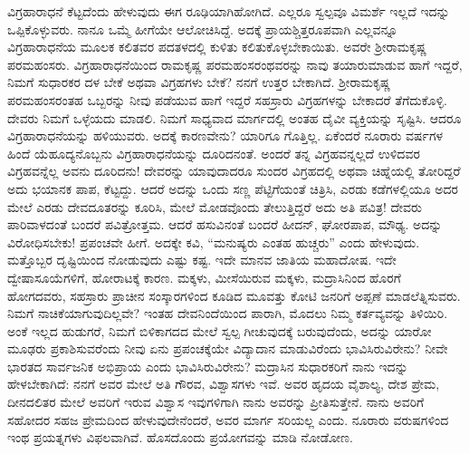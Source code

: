 ವಿಗ್ರಹಾರಾಧನೆ ಕೆಟ್ಟದೆಂದು ಹೇಳುವುದು ಈಗ ರೂಢಿಯಾಗಿಹೋಗಿದೆ. ಎಲ್ಲರೂ ಸ್ವಲ್ಪವೂ ವಿಮರ್ಶೆ ಇಲ್ಲದೆ ಇದನ್ನು ಒಪ್ಪಿಕೊಳ್ಳುವರು. ನಾನೂ ಒಮ್ಮೆ ಹೀಗೆಯೇ ಆಲೋಚಿ\-ಸಿದ್ದೆ. ಅದಕ್ಕೆ ಪ್ರಾಯಶ್ಚಿತ್ತರೂಪವಾಗಿ ಎಲ್ಲವನ್ನೂ ವಿಗ್ರಹಾರಾಧನೆಯ ಮೂಲಕ ಕಲಿತವರ ಪದತಳದಲ್ಲಿ ಕುಳಿತು ಕಲಿತುಕೊಳ್ಳಬೇಕಾಯಿತು. ಅವರೇ ಶ‍್ರೀರಾಮಕೃಷ್ಣ ಪರಮಹಂಸರು. ವಿಗ್ರಹಾರಾಧನೆಯಿಂದ ರಾಮಕೃಷ್ಣ ಪರಮಹಂಸರಂಥವರನ್ನು ನಾವು ತಯಾರು\-ಮಾಡುವ ಹಾಗೆ ಇದ್ದರೆ, ನಿಮಗೆ ಸುಧಾರಕರ ದಳ ಬೇಕೆ ಅಥವಾ ವಿಗ್ರಹಗಳು ಬೇಕೆ? ನನಗೆ ಉತ್ತರ ಬೇಕಾಗಿದೆ. ಶ‍್ರೀರಾಮಕೃಷ್ಣ ಪರಮಹಂಸರಂತಹ ಒಬ್ಬರನ್ನು ನೀವು ಪಡೆಯುವ ಹಾಗೆ ಇದ್ದರೆ ಸಹಸ್ರಾರು ವಿಗ್ರಹಗಳನ್ನು ಬೇಕಾದರೆ ತೆಗೆದುಕೊಳ್ಳಿ. ದೇವರು ನಿಮಗೆ ಒಳ್ಳೆಯದು ಮಾಡಲಿ. ನಿಮಗೆ ಸಾಧ್ಯವಾದ ಮಾರ್ಗದಲ್ಲಿ ಅಂತಹ ದೈವೀ ವ್ಯಕ್ತಿಯನ್ನು ಸೃಷ್ಟಿಸಿ. ಆದರೂ ವಿಗ್ರಹಾರಾಧನೆಯನ್ನು ಹಳಿಯುವರು. ಅದಕ್ಕೆ ಕಾರಣವೇನು? ಯಾರಿಗೂ ಗೊತ್ತಿಲ್ಲ. ಏಕೆಂದರೆ ನೂರಾರು ವರ್ಷಗಳ ಹಿಂದೆ ಯೆಹೂದ್ಯನೊಬ್ಬನು ವಿಗ್ರಹಾ\-ರಾಧನೆಯನ್ನು ದೂರಿದನಂತೆ. ಅಂದರೆ ತನ್ನ ವಿಗ್ರಹವನ್ನಲ್ಲದೆ ಉಳಿದವರ ವಿಗ್ರಹವನ್ನೆಲ್ಲ ಅವನು ದೂರಿದನು! ದೇವರನ್ನು ಯಾವುದಾದರೂ ಸುಂದರ ವಿಗ್ರಹದಲ್ಲಿ ಅಥವಾ ಚಿಹ್ನೆಯಲ್ಲಿ ತೋರಿದ್ದರೆ ಅದು ಭಯಾನಕ ಪಾಪ, ಕೆಟ್ಟದ್ದು. ಆದರೆ ಅದನ್ನು ಒಂದು ಸಣ್ಣ ಪೆಟ್ಟಿಗೆಯಂತೆ ಚಿತ್ರಿಸಿ, ಎರಡು ಕಡೆಗಳಲ್ಲಿಯೂ ಅದರ ಮೇಲೆ ಎರಡು ದೇವದೂತರನ್ನು ಕೂರಿಸಿ, ಮೇಲೆ ಮೋಡವೊಂದು ತೇಲುತ್ತಿದ್ದರೆ ಅದು ಅತಿ ಪವಿತ್ರ! ದೇವರು ಪಾರಿವಾಳ\-ದಂತೆ ಬಂದರೆ ಪವಿತ್ರೋತ್ತಮ. ಆದರೆ ಹಸುವಿನಂತೆ ಬಂದರೆ ಹೀದನ್​, ಘೋರಪಾಪ, ಮೌಢ್ಯ. ಅದನ್ನು ವಿರೋಧಿಸಬೇಕು! ಪ್ರಪಂಚವೇ ಹೀಗೆ. ಅದಕ್ಕೇ ಕವಿ, “ಮನುಷ್ಯರು ಎಂತಹ ಹುಚ್ಚರು” ಎಂದು ಹೇಳುವುದು. ಮತ್ತೊಬ್ಬರ ದೃಷ್ಟಿಯಿಂದ ನೋಡುವುದು ಎಷ್ಟು ಕಷ್ಟ. ಇದೇ ಮಾನವ ಜಾತಿಯ ಮಹಾದೋಷ. ಇದೇ ದ್ವೇಷಾಸೂಯೆಗಳಿಗೆ, ಹೋರಾಟಕ್ಕೆ ಕಾರಣ. ಮಕ್ಕಳು, ಮೀಸೆಯಿರುವ ಮಕ್ಕಳು, ಮದ್ರಾಸಿನಿಂದ ಹೊರಗೆ ಹೋಗದವರು, ಸಹಸ್ರಾರು ಪ್ರಾಚೀನ ಸಂಸ್ಕಾರಗಳಿಂದ ಕೂಡಿದ ಮೂವತ್ತು ಕೋಟಿ ಜನರಿಗೆ ಅಪ್ಪಣೆ ಮಾಡಲೆತ್ನಿಸುವರು. ನಿಮಗೆ ನಾಚಿಕೆಯಾಗುವುದಿಲ್ಲವೇ? ಇಂತಹ ದೇವನಿಂದೆಯಿಂದ ಪಾರಾಗಿ, ಮೊದಲು ನಿಮ್ಮ ಕರ್ತವ್ಯವನ್ನು ತಿಳಿಯಿರಿ. ಅಂಕೆ ಇಲ್ಲದ ಹುಡುಗರೆ, ನಿಮಗೆ ಬಿಳಿಕಾಗದದ ಮೇಲೆ ಸ್ವಲ್ಪ ಗೀಚುವುದಕ್ಕೆ ಬರುವುದೆಂದು, ಅದನ್ನು ಯಾರೋ ಮೂಢರು ಪ್ರಕಾಶಿಸುವರೆಂದು ನೀವು ಏನು ಪ್ರಪಂಚಕ್ಕೆಯೇ ವಿದ್ಯಾದಾನ ಮಾಡುವಿರೆಂದು ಭಾವಿಸಿರುವಿರೇನು? ನೀವೇ ಭಾರತದ ಸಾರ್ವಜನಿಕ ಅಭಿಪ್ರಾಯ ಎಂದು ಭಾವಿಸಿರುವಿರೇನು? ಮದ್ರಾಸಿನ ಸುಧಾರಕರಿಗೆ ನಾನು ಇದನ್ನು ಹೇಳಬೇಕಾಗಿದೆ: ನನಗೆ ಅವರ ಮೇಲೆ ಅತಿ ಗೌರವ, ವಿಶ್ವಾಸಗಳು ಇವೆ. ಅವರ ಹೃದಯ ವೈಶಾಲ್ಯ, ದೇಶ ಪ್ರೇಮ, ದೀನದಲಿತರ ಮೇಲೆ ಅವರಿಗೆ ಇರುವ ವಿಶ್ವಾಸ ಇವುಗಳಿಗಾಗಿ ನಾನು ಅವರನ್ನು ಪ್ರೀತಿಸುತ್ತೇನೆ. ನಾನು ಅವರಿಗೆ ಸಹೋದರ ಸಹಜ ಪ್ರೇಮದಿಂದ ಹೇಳುವುದೇನೆಂದರೆ, ಅವರ ಮಾರ್ಗ ಸರಿಯಲ್ಲ ಎಂದು. ನೂರಾರು ವರುಷಗಳಿಂದ ಇಂಥ ಪ್ರಯತ್ನಗಳು ವಿಫಲವಾಗಿವೆ. ಹೊಸದೊಂದು ಪ್ರಯೋಗವನ್ನು ಮಾಡಿ ನೋಡೋಣ.

\vskip   4pt

